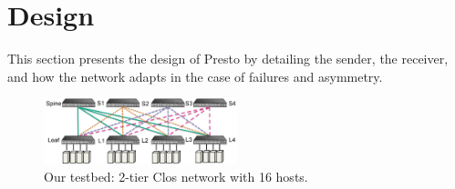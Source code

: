 \section{Design}
\label{sec:design}

This section presents the design of Presto by detailing
the sender, the receiver, and how the network
adapts in the case of failures and asymmetry.


%
%
%
%
%
%
%

\begin{figure}[!t]
        \centering
  \includegraphics[width=0.5\textwidth,height=0.17\textwidth]{presto/figures/macro/macro_evaluation_topology_refined.pdf}
        \caption{Our testbed: 2-tier Clos network with 16 hosts.}
        \label{macro_evaluation_topology}
\end{figure}

